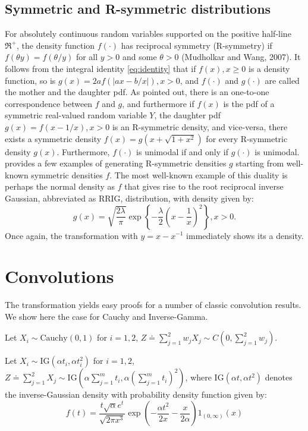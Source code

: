 \documentclass[letterpaper,11pt]{article}
\begin{document}
\subsection{Symmetric and R-symmetric distributions}

For absolutely continuous random variables supported on the positive half-line $\Re^{+}$, the density function $f(\cdot)$ has reciprocal symmetry (R-symmetry) if $f(\theta y) = f(\theta / y)$ for all $y > 0$ and some $\theta >0$ (Mudholkar and Wang, 2007). It follows from the integral identity \eqref{eq:identity} that if $f(x), x \geq 0$ is a density function, so is $g(x) = 2a f(|ax-b/x|), x >0$, and $f(\cdot)$ and $g(\cdot)$ are called the mother and the daughter pdf. As \cite{chaubey2010reciprocal} pointed out, there is an one-to-one correspondence between $f$ and $g$, and furthermore if $f(x)$ is the pdf of a symmetric real-valued random variable $Y$, the daughter pdf $g(x) = f(x-1/x), x>0$ is an R-symmetric density, and vice-versa, there exists a symmetric density $f(x) = g(x+\sqrt{1+x^2})$ for every R-symmetric density $g(x)$. Furthermore, $f(\cdot)$ is unimodal if and only if $g(\cdot)$ is unimodal. \cite{chaubey2010reciprocal} provides a few examples of generating R-symmetric densities $g$ starting from well-known symmetric densities $f$. The most well-known example of this duality is perhaps the normal density as $f$ that gives rise to the root reciprocal inverse Gaussian, abbreviated as RRIG, distribution, with density given by: 
$$
g(x) = \sqrt{\frac{2\lambda}{\pi}} \exp \left\{ - \frac{\lambda}{2} \left( x - \frac{1}{x} \right)^2 \right\}, x >0.
$$
Once again, the \CS transformation with $y = x - x^{-1}$ immediately shows its a density. 

\section{Convolutions}

The \CS transformation yields easy proofs for a number of classic convolution results. We show here the case for Cauchy and Inverse-Gamma. 
\begin{lemma}
Let $X_i \sim \mathrm{Cauchy}(0,1)$ for $i =1,2$, $Z \doteq \sum_{j=1}^{2} w_j X_j  \sim C \left( 0,\sum_{j=1}^{2} w_j \right)$.
\end{lemma}
\begin{lemma}
Let $X_i \sim \mathrm{IG}(\alpha t_i, \alpha t_i^2)$ for $i = 1,2$, $Z \doteq \sum_{j=1}^{2} X_j \sim \mathrm{IG}(\alpha \sum_{j=1}^{m} t_i, \alpha (\sum_{j=1}^{m} t_i)^2)$, where $\mathrm{IG}(\alpha t, \alpha t^2)$ denotes the inverse-Gaussian density with probability density function given by:
$$
f(t) = \frac{t \sqrt{\alpha} e^t}{\sqrt{2 \pi x^3}} \exp \left( -\frac{\alpha t^2}{2x} - \frac{x}{2\alpha} \right) 1_{(0,\infty)}(x) 
$$
\end{lemma}
\end{document}

